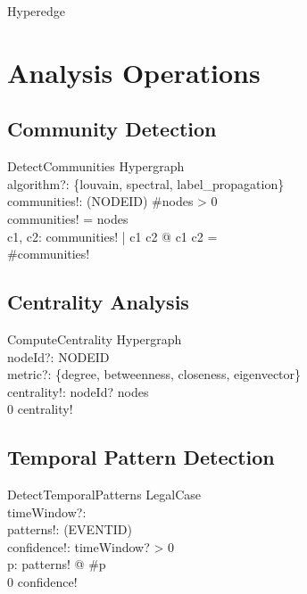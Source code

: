 \documentclass{article}
\begin{document}
\begin{class}{Hyperedge}
\newpage

\section{Analysis Operations}

\subsection{Community Detection}

\begin{schema}{DetectCommunities}
    \Xi Hypergraph \\
    algorithm?: \{louvain, spectral, label\_propagation\} \\
    communities!: \power (\power NODEID)
\where
    \#nodes > 0 \\
    \bigcup communities! = \dom nodes \\
    \forall c1, c2: communities! | c1 \neq c2 @ c1 \cap c2 = \emptyset \\
    \#communities! 
\end{schema}

\subsection{Centrality Analysis}

\begin{schema}{ComputeCentrality}
    \Xi Hypergraph \\
    nodeId?: NODEID \\
    metric?: \{degree, betweenness, closeness, eigenvector\} \\
    centrality!: \real
\where
    nodeId? \in \dom nodes \\
    0 \leq centrality! 
\end{schema}

\subsection{Temporal Pattern Detection}

\begin{schema}{DetectTemporalPatterns}
    \Xi LegalCase \\
    timeWindow?: \real \\
    patterns!: \power (\seq EVENTID) \\
    confidence!: \real
\where
    timeWindow? > 0 \\
    \forall p: patterns! @ \#p  \\
    0 \leq confidence! 
\end{schema}


\end{class}
\end{document}
